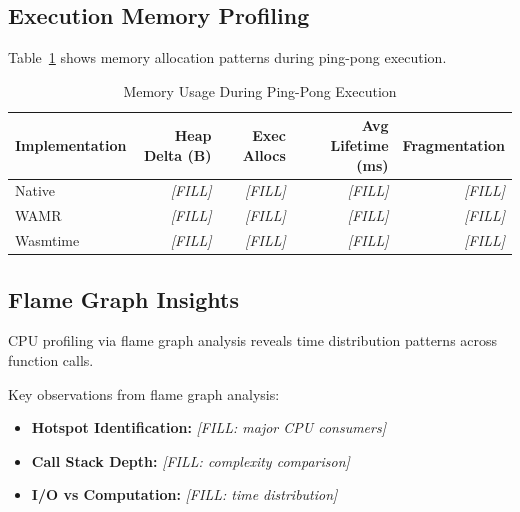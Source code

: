 \subsection{Execution Memory Profiling}
\label{subsec:memory-execution}

Table~\ref{tab:memory-execution} shows memory allocation patterns during ping-pong execution.

\begin{table}[htbp]
\centering
\caption{Memory Usage During Ping-Pong Execution}
\label{tab:memory-execution}
\begin{tabular}{lrrrr}
\toprule
\textbf{Implementation} & \textbf{Heap Delta (B)} & \textbf{Exec Allocs} & \textbf{Avg Lifetime (ms)} & \textbf{Fragmentation} \\
\midrule
Native        & \textit{[FILL]} & \textit{[FILL]} & \textit{[FILL]} & \textit{[FILL]} \\
WAMR          & \textit{[FILL]} & \textit{[FILL]} & \textit{[FILL]} & \textit{[FILL]} \\
Wasmtime      & \textit{[FILL]} & \textit{[FILL]} & \textit{[FILL]} & \textit{[FILL]} \\
\bottomrule
\end{tabular}
\end{table}

\subsection{Flame Graph Insights}
\label{subsec:flamegraph-analysis}

CPU profiling via flame graph analysis reveals time distribution patterns across function calls.


Key observations from flame graph analysis:
\begin{itemize}
    \item \textbf{Hotspot Identification:} \textit{[FILL: major CPU consumers]}
    \item \textbf{Call Stack Depth:} \textit{[FILL: complexity comparison]}
    \item \textbf{I/O vs Computation:} \textit{[FILL: time distribution]}
\end{itemize}

